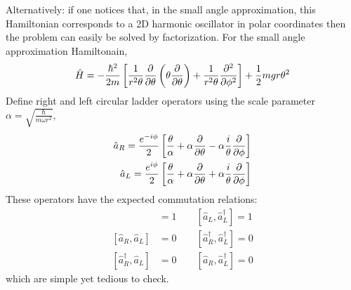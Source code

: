 \documentclass[12pt]{extarticle}
\begin{document}
Alternatively: if one notices that, in the small angle approximation, this Hamiltonian corresponds to a 2D harmonic oscillator in polar coordinates then the problem can easily be solved by factorization. For the small angle approximation Hamiltonain,
\[\hat{H} = -\frac{\hbar^2}{2m}  \left[ \frac{1}{r^2 \theta} \frac{\partial{}}{\partial{\theta}} \left( \theta \frac{\partial{}}{\partial{\theta}} \right) + \frac{1}{r^2 \theta} \frac{\partial^2{}}{\partial{\phi}^2} \right] + \frac{1}{2} mgr \theta^2 \]
Define right and left circular ladder operators using the scale parameter $\alpha = \sqrt{\frac{\hbar}{m \omega r^2}}$,
\begin{align*}
\hat{a}_R = \frac{e^{-i \phi}}{2} \left[\frac{\theta}{\alpha}  + \alpha \frac{\partial{}}{\partial{\theta}} - \alpha \frac{i}{\theta} \frac{\partial{}}{\partial{\phi}}  \right] \\
\hat{a}_L = \frac{e^{i \phi}}{2} \left[\frac{\theta}{\alpha}  + \alpha \frac{\partial{}}{\partial{\theta}} + \alpha \frac{i}{\theta} \frac{\partial{}}{\partial{\phi}}  \right] 
\end{align*}
These operators have the expected commutation relations: 
\begin{align*}
[\hat{a}_R, \hat{a}^\dagger_R] &= 1 \quad \quad
[\hat{a}_L, \hat{a}^\dagger_L] = 1 \\
[\hat{a}_R, \hat{a}_L] &= 0 \quad \quad
[\hat{a}_R^\dagger, \hat{a}^\dagger_L] = 0 \\
[\hat{a}^\dagger_R, \hat{a}_L] &= 0 \quad \quad
[\hat{a}_R, \hat{a}^\dagger_L] = 0 
\end{align*}
which are simple yet tedious to check. 
\end{document}
